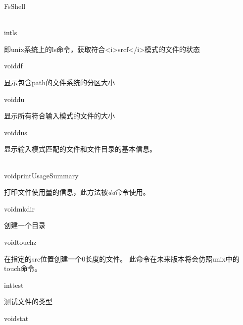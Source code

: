 \begin{XeClass}{FsShell}
  \begin{XeMethod}{\XePrivate\\ }{int}{ls}
       
 即unix系统上的ls命令，获取符合<i>srcf</i>模式的文件的状态

  \end{XeMethod}

  \begin{XeMethod}{}{void}{df}
       
 显示包含path的文件系统的分区大小

  \end{XeMethod}

  \begin{XeMethod}{}{void}{du}
       
 显示所有符合输入模式的文件的大小

  \end{XeMethod}

  \begin{XeMethod}{}{void}{dus}
       
 显示输入模式匹配的文件和文件目录的基本信息。

  \end{XeMethod}

  \begin{XeMethod}{\XePrivate\\ }{void}{printUsageSummary}
       
 打印文件使用量的信息，此方法被\emph{du}命令使用。

  \end{XeMethod}

  \begin{XeMethod}{}{void}{mkdir}
       
 创建一个目录

  \end{XeMethod}

  \begin{XeMethod}{}{void}{touchz}
       
 在指定的src位置创建一个0长度的文件。
 此命令在未来版本将会仿照unix中的touch命令。

  \end{XeMethod}

  \begin{XeMethod}{}{int}{test}
       
 测试文件的类型

  \end{XeMethod}

  \begin{XeMethod}{}{void}{stat}
       

\end{XeMethod}
\end{XeClass}
